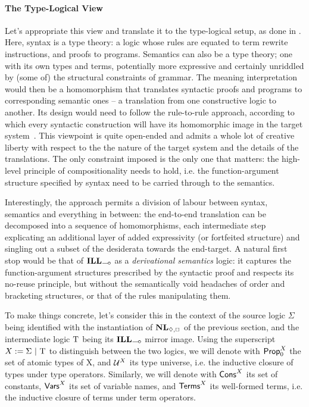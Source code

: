 \paragraph{The Type-Logical View}
Let's appropriate this view and translate it to the type-logical setup, as done in \citet{van1988semantics}.
Here, syntax is a type theory: a logic whose rules are equated to term rewrite instructions, and proofs to programs.
Semantics can also be a type theory; one with its own types and terms, potentially more expressive and certainly unriddled by (some of) the structural constraints of grammar.
The meaning interpretation would then be a homomorphism that translates syntactic proofs and programs to corresponding semantic ones -- a translation from one constructive logic to another.
Its design would need to follow the rule-to-rule approach, according to which every syntactic construction will have its homomorphic image in the target system~\cite{bach1976extension}.
This viewpoint is quite open-ended and admits a whole lot of creative liberty with respect to the the nature of the target system and the details of the translations.
The only constraint imposed is the only one that matters: the high-level principle of compositionality needs to hold, i.e. the function-argument structure specified by syntax need to be carried through to the semantics.

Interestingly, the approach permits a division of labour between syntax, semantics and everything in between: the end-to-end translation can be decomposed into a sequence of homomorphisms, each intermediate step explicating an additional layer of added expressivity (or fortfeited structure) and singling out a subset of the desiderata towards the end-target.
A natural first stop would be that of $\ILL_{\li}$ as a \textit{derivational semantics} logic: it captures the function-argument structures prescribed by the syntactic proof and respects its no-reuse principle, but without the semantically void headaches of order and bracketing structures, or that of the rules manipulating them. 

To make things concrete, let's consider this in the context of the source logic $\Sigma$ being identified with the instantiation of $\NL_{\diamond,\Box}$ of the previous section, and the intermediate logic $\mathrm{T}$ being its $\ILL_{\li}$ mirror image.
Using the superscript $X := \Sigma \ | \ \mathrm{T}$ to distinguish between the two logics,
we will denote with $\mathsf{Prop}_0^X$ the set of atomic types of X, and $\mathcal{U}^X$ its type universe, i.e. the inductive closure of types under type operators.
Similarly, we will denote with $\mathsf{Cons}^{X}$ its set of constants, $\mathsf{Vars}^{X}$ its set of variable names, and $\mathsf{Terms}^{X}$ its well-formed terms, i.e. the inductive closure of terms under term operators.

